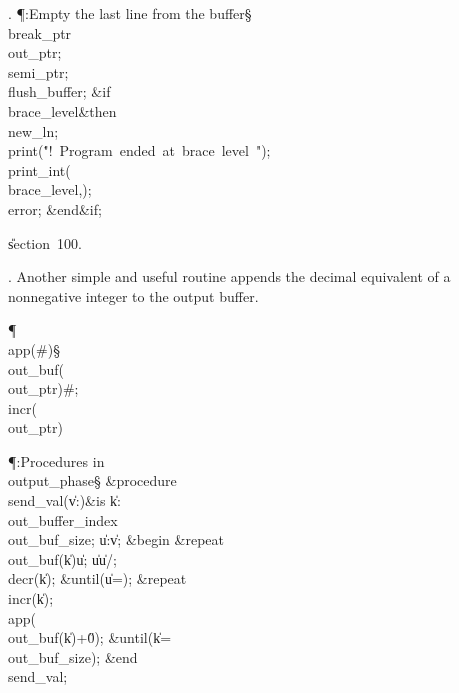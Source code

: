 . \P\?:Empty the last line from the buffer\X\S\?\6
\\{break\_ptr}\?\K\?\\{out\_ptr};\5
\\{semi\_ptr}\?\K{};\5
\\{flush\_buffer};\6
\&{if}\1\1\8\\{brace\_level}\?\I{}\2\8\&{then}\6
\\{new\_ln};\5
\\{print}\?\1(\?\.{"!\ Program\ ended\ at\ brace\ level\ "}\?\2)\?;\5
\\{print\_int}\?\1(\?\\{brace\_level}\?,\?\2)\?;\5
\\{error};\2\6
\&{end}\8\2\&{if}\1;\par
\U section~100.\fi

. Another simple and useful routine appends the decimal equivalent of
a nonnegative integer to the output buffer.

\Y\P\4\D\\{app}\?\1(\?\#\?\2)\S\?\\{out\_buf}\?\1(\?\\{out\_ptr}\?\2)\K\?\#; %
\\{incr}\?\1(\?\\{out\_ptr}\?\2)\6
\?\par
\Y\P\?\4:Procedures in \\{output\_phase}\X\mathrel{+}\S\?\6
\&{procedure}\8\1\\{send\_val}\?(\1\?\|v\?:\?\?\2)\?\2\8\&{is}\8%
\1\6
\|k\?:\?\\{out\_buffer\_index}\?\K\?\\{out\_buf\_size};\6
\|u\?:\?\?\K\?\|v;\6
\4\&{begin}\6
\1\&{repeat}\6
\\{out\_buf}\?\1(\?\|k\?\2)\K\?\|u\?;\5
\|u\?\K\?\|u\?/;\5
\\{decr}\?\1(\?\|k\?\2)\?;\2\6
\&{until}\?\8\1(\?\|u\?=\?\2)\?;\6
\1\&{repeat}\6
\\{incr}\?\1(\?\|k\?\2)\?;\5
\\{app}\?\1(\?\\{out\_buf}\?\1(\?\|k\?\2)+\?\H{0}\?\2)\?;\2\6
\&{until}\?\8\1(\?\|k\?=\?\\{out\_buf\_size}\?\2)\?;\2\6
\&{end}\8\\{send\_val};\par
\fi

